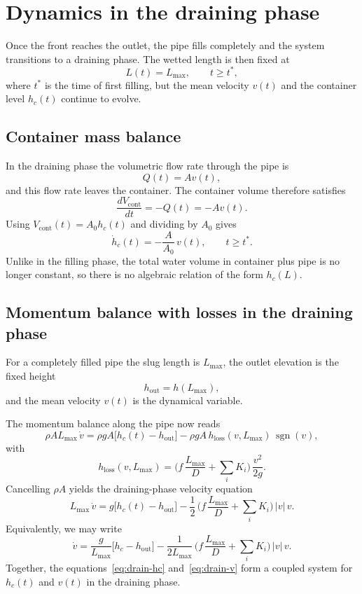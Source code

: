 \documentclass[11pt]{article}
\begin{document}
\section{Dynamics in the draining phase}

Once the front reaches the outlet, the pipe fills completely and the system transitions to a
draining phase. The wetted length is then fixed at
\[
  L(t) = L_{\max},\qquad t \ge t^*,
\]
where $t^*$ is the time of first filling, but the mean velocity $v(t)$ and the container level
$h_c(t)$ continue to evolve.

\subsection{Container mass balance}

In the draining phase the volumetric flow rate through the pipe is
\[
  Q(t) = A v(t),
\]
and this flow rate leaves the container. The container volume therefore satisfies
\[
  \frac{dV_{\text{cont}}}{dt} = -Q(t) = -A v(t).
\]
Using $V_{\text{cont}}(t) = A_0 h_c(t)$ and dividing by $A_0$ gives
\begin{equation}
  \dot h_c(t) = -\frac{A}{A_0}\,v(t),\qquad t \ge t^*.
  \label{eq:drain-hc}
\end{equation}
Unlike in the filling phase, the total water volume in container plus pipe is no longer
constant, so there is no algebraic relation of the form $h_c(L)$.

\subsection{Momentum balance with losses in the draining phase}

For a completely filled pipe the slug length is $L_{\max}$, the outlet elevation is the fixed height
\[
  h_{\text{out}} = h(L_{\max}),
\]
and the mean velocity $v(t)$ is the dynamical variable.

The momentum balance along the pipe now reads
\[
  \rho A L_{\max}\,\dot v
  = \rho g A\bigl[h_c(t) - h_{\text{out}}\bigr]
    - \rho g A\,h_{\text{loss}}(v,L_{\max})\,\operatorname{sgn}(v),
\]
with
\[
  h_{\text{loss}}(v,L_{\max})
  = \Big(f\,\frac{L_{\max}}{D} + \sum_i K_i\Big)\,\frac{v^2}{2g}.
\]
Cancelling $\rho A$ yields the draining-phase velocity equation
\begin{equation}
  L_{\max}\,\dot v
  = g\bigl[h_c(t) - h_{\text{out}}\bigr]
    - \frac{1}{2}\,\Big(f\,\frac{L_{\max}}{D} + \sum_i K_i\Big)\,|v|\,v.
  \label{eq:drain-v-L}
\end{equation}
Equivalently, we may write
\begin{equation}
  \dot v
  = \frac{g}{L_{\max}}\bigl[h_c - h_{\text{out}}\bigr]
    - \frac{1}{2L_{\max}}\,\Big(f\,\frac{L_{\max}}{D} + \sum_i K_i\Big)\,|v|\,v.
  \label{eq:drain-v}
\end{equation}
Together, the equations~\eqref{eq:drain-hc} and~\eqref{eq:drain-v}
form a coupled system for $h_c(t)$ and $v(t)$ in the draining phase.
\end{document}
